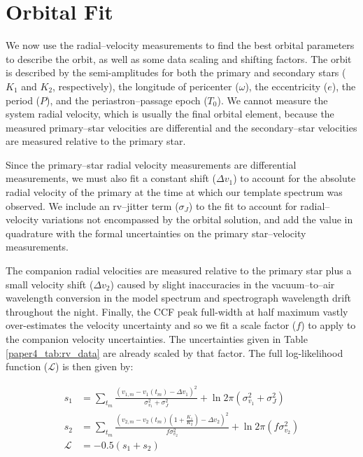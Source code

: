\section{Orbital Fit}
\label{paper4_sec:orbit}

We now use the radial--velocity measurements to find the best orbital parameters to describe the orbit, as well as some data scaling and shifting factors. The orbit is described by the semi-amplitudes for both the primary and secondary stars ($K_1$ and $K_2$, respectively), the longitude of pericenter ($\omega$), the eccentricity ($e$), the period ($P$), and the periastron--passage epoch ($T_0$). We cannot measure the system radial velocity, which is usually the final orbital element, because the measured primary--star velocities are differential and the secondary--star velocities are measured relative to the primary star.

Since the primary--star radial velocity measurements are differential measurements, we must also fit a constant shift ($\Delta v_1$) to account for the absolute radial velocity of the primary at the time at which our template spectrum was observed. We include an rv--jitter term ($\sigma_J$) to the fit to account for radial--velocity variations not encompassed by the orbital solution, and add the value in quadrature with the formal uncertainties on the primary star--velocity measurements. 

The companion radial velocities are measured relative to the primary star plus a small velocity shift ($\Delta v_2$) caused by slight inaccuracies in the vacuum--to--air wavelength conversion in the model spectrum and spectrograph wavelength drift throughout the night. Finally, the CCF peak full-width at half maximum vastly over-estimates the velocity uncertainty and so we fit a scale factor ($f$) to apply to the companion velocity uncertainties. The uncertainties given in Table \ref{paper4_tab:rv_data} are already scaled by that factor. The full log-likelihood function ($\mathcal{L}$) is then given by:

\begin{align*}
s_1 &= \sum_{t_m} \frac{(v_{1,m} - v_1(t_m) - \Delta v_1)^2 }{\sigma_{v_1}^2 + \sigma_J^2} + \ln{2\pi(\sigma_{v_1}^2 + \sigma_J^2)} \\
s_2 &= \sum_{t_m} \frac{(v_{2,m} - v_2(t_m)(1+\frac{K_1}{K_2}) - \Delta v_2)^2}{f\sigma_{v_2}^2 } + \ln{2\pi(f\sigma_{v_2}^2)} \\ 
\mathcal{L} &= -0.5(s_1 + s_2) \\
\end{align*}

